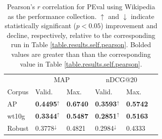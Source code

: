 \documentclass{sig-alternate}
\begin{document}
\begin{table}
\centering
\begin{tabular}{|l|l|l|l|l|l|} \hline
& \multicolumn{2}{c|}{MAP} & \multicolumn{2}{c|}{nDCG@20} \\ \cline{2-5}
Corpus & Valid. & Max. & Valid. & Max. \\ \hline\hline
AP & \textbf{0.4495}$^{\uparrow}$ & \textbf{0.6740} & \textbf{0.3593}$^{\uparrow}$ & \textbf{0.5742} \\ \hline
wt10g & \textbf{0.3344}$^{\uparrow}$ & \textbf{0.5487} & \textbf{0.2851}$^{\uparrow}$ & \textbf{0.5163} \\ \hline
Robust & 0.3778$^{\downarrow}$ & 0.4821 & 0.2984$^{\downarrow}$ & 0.4333 \\ \hline
\end{tabular}
\caption{Pearson's $r$ correlation for PEval using Wikipedia as the performance collection. $\uparrow$ and $\downarrow$ indicate statistically significant ($p < 0.05$) improvement and decline, respectively, relative to the corresponding run in Table \ref{table.results.self.pearson}. Bolded values are greater than than the corresponding value in Table \ref{table.results.self.pearson}.}
\label{table.results.wiki.pearson}
\end{table}
\end{document}
